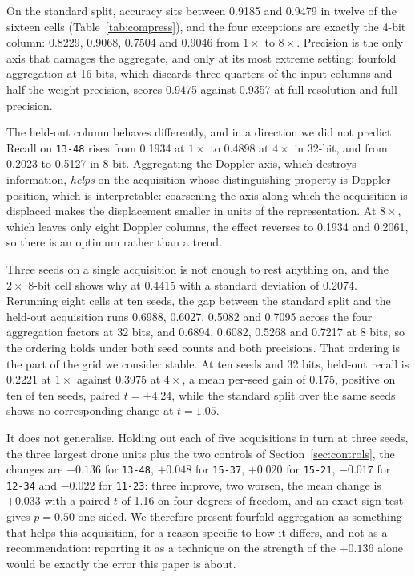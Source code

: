 \documentclass[11pt,a4paper]{article}
\newcommand{\s}[1]{\texttt{#1}}            %
\newcommand{\tgt}{\s{13-48}}               %
\begin{document}
\begin{table}[!htbp]
\caption{Input aggregation by weight precision, three seeds per cell.
Standard-split columns are grouped-protocol accuracy and drone recall.
Held-out columns are recall on \tgt{} with the acquisition absent from
training, which is why they are far lower and far noisier: a single
acquisition at three seeds, not an aggregate.}
\label{tab:compress}
\centering
\small

\end{table}

On the standard split, accuracy sits between 0.9185 and 0.9479 in twelve of
the sixteen cells (Table~\ref{tab:compress}), and the four exceptions are
exactly the 4-bit column: 0.8229, 0.9068, 0.7504 and 0.9046 from $1\times$
to $8\times$. Precision is the only axis that damages the aggregate, and
only at its most extreme setting: fourfold aggregation at 16 bits, which
discards three quarters of the input columns and half the weight precision,
scores 0.9475 against 0.9357 at full resolution and full precision.

The held-out column behaves differently, and in a direction we did not
predict. Recall on \tgt{} rises from 0.1934 at $1\times$ to 0.4898 at
$4\times$ in 32-bit, and from 0.2023 to 0.5127 in 8-bit. Aggregating the
Doppler axis, which destroys information, \emph{helps} on the acquisition
whose distinguishing property is Doppler position, which is interpretable:
coarsening the axis along which the acquisition is displaced makes the
displacement smaller in units of the representation. At $8\times$, which
leaves only eight Doppler columns, the effect reverses to 0.1934 and
0.2061, so there is an optimum rather than a trend.

Three seeds on a single acquisition is not enough to rest anything on, and
the $2\times$ 8-bit cell shows why at 0.4415 with a standard deviation of
0.2074. Rerunning eight cells at ten seeds, the gap between the standard
split and the held-out acquisition runs 0.6988, 0.6027, 0.5082 and 0.7095
across the four aggregation factors at 32 bits, and 0.6894, 0.6082, 0.5268
and 0.7217 at 8 bits, so the ordering holds under both seed counts and both
precisions. That ordering is the part of the grid we consider stable. At
ten seeds and 32 bits, held-out recall is 0.2221 at $1\times$ against
0.3975 at $4\times$, a mean per-seed gain of 0.175, positive on ten of ten
seeds, paired $t = +4.24$, while the standard split over the same seeds
shows no corresponding change at $t = 1.05$.

It does not generalise. Holding out each of five acquisitions in turn at
three seeds, the three largest drone units plus the two controls of
Section~\ref{sec:controls}, the changes are $+0.136$ for \tgt, $+0.048$ for
\s{15-37}, $+0.020$ for \s{15-21}, $-0.017$ for \s{12-34} and $-0.022$ for
\s{11-23}: three improve, two worsen, the mean change is $+0.033$ with a
paired $t$ of 1.16 on four degrees of freedom, and an exact sign test gives
$p = 0.50$ one-sided. We therefore present fourfold aggregation as
something that helps this acquisition, for a reason specific to how it
differs, and not as a recommendation: reporting it as a technique on the
strength of the $+0.136$ alone would be exactly the error this paper is
about.
\end{document}
